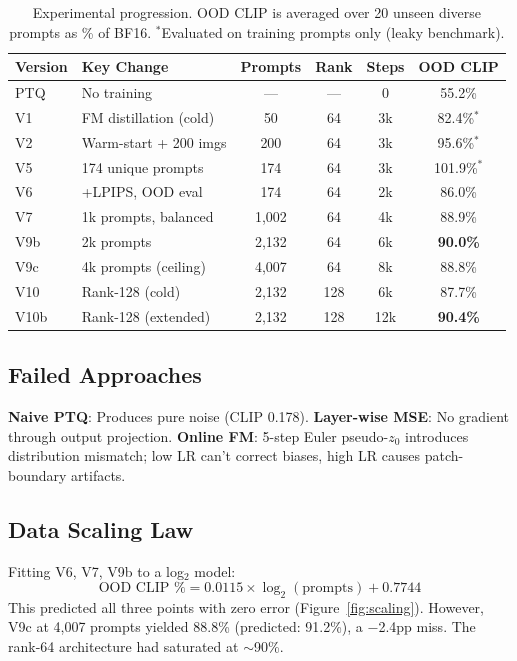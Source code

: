 \documentclass[11pt]{article}
\begin{document}
\begin{table}[h]
\centering
\caption{Experimental progression. OOD CLIP is averaged over 20 unseen diverse prompts as \% of BF16.
$^*$Evaluated on training prompts only (leaky benchmark).}
\label{tab:progression}
\small
\begin{tabular}{llcccc}
\toprule
\textbf{Version} & \textbf{Key Change} & \textbf{Prompts} & \textbf{Rank} & \textbf{Steps} & \textbf{OOD CLIP} \\
\midrule
PTQ & No training & --- & --- & 0 & 55.2\% \\
V1 & FM distillation (cold) & 50 & 64 & 3k & 82.4\%$^*$ \\
V2 & Warm-start + 200 imgs & 200 & 64 & 3k & 95.6\%$^*$ \\
V5 & 174 unique prompts & 174 & 64 & 3k & 101.9\%$^*$ \\
\midrule
V6 & +LPIPS, OOD eval & 174 & 64 & 2k & 86.0\% \\
V7 & 1k prompts, balanced & 1{,}002 & 64 & 4k & 88.9\% \\
V9b & 2k prompts & 2{,}132 & 64 & 6k & \textbf{90.0\%} \\
V9c & 4k prompts (ceiling) & 4{,}007 & 64 & 8k & 88.8\% \\
\midrule
V10 & Rank-128 (cold) & 2{,}132 & 128 & 6k & 87.7\% \\
V10b & Rank-128 (extended) & 2{,}132 & 128 & 12k & \textbf{90.4\%} \\
\bottomrule
\end{tabular}
\end{table}

\subsection{Failed Approaches}

\textbf{Naive PTQ}: Produces pure noise (CLIP 0.178).
\textbf{Layer-wise MSE}: No gradient through output projection.
\textbf{Online FM}: 5-step Euler pseudo-$z_0$ introduces distribution mismatch; low LR can't correct biases, high LR causes patch-boundary artifacts.

\subsection{Data Scaling Law}

Fitting V6, V7, V9b to a log$_2$ model:
\begin{equation}
  \text{OOD CLIP \%} = 0.0115 \times \log_2(\text{prompts}) + 0.7744
  \label{eq:scaling}
\end{equation}
This predicted all three points with zero error (Figure~\ref{fig:scaling}).
However, V9c at 4{,}007 prompts yielded 88.8\% (predicted: 91.2\%), a $-$2.4pp miss.
The rank-64 architecture had saturated at $\sim$90\%.
\end{document}
